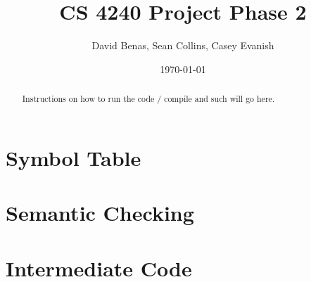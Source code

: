 \documentclass[a4paper]{article}
\title{CS 4240 Project Phase 2}
\author{David Benas, Sean Collins, Casey Evanish}
\date{\today}
\begin{document}
\maketitle

\begin{abstract}
Instructions on how to run the code / compile and such will go here.
\end{abstract}

\section{Symbol Table}

\section{Semantic Checking}

\section{Intermediate Code}
\end{document}

